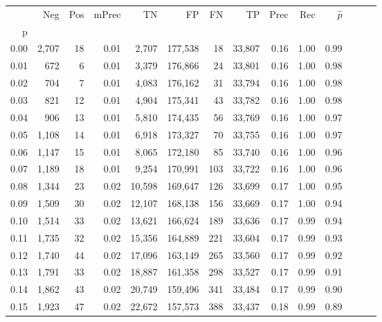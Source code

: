 \begin{tabular}{rrrrrrrrrrrrrr}
\toprule
{} &    Neg &  Pos & mPrec &       TN &       FP &      FN &      TP &  Prec &   Rec & $\hat{p}$ \\
p    &        &      &       &          &          &         &         &       &       &           \\
\midrule
0.00 &  2,707 &   18 &  0.01 &    2,707 &  177,538 &      18 &  33,807 &  0.16 &  1.00 &      0.99 \\
0.01 &    672 &    6 &  0.01 &    3,379 &  176,866 &      24 &  33,801 &  0.16 &  1.00 &      0.98 \\
0.02 &    704 &    7 &  0.01 &    4,083 &  176,162 &      31 &  33,794 &  0.16 &  1.00 &      0.98 \\
0.03 &    821 &   12 &  0.01 &    4,904 &  175,341 &      43 &  33,782 &  0.16 &  1.00 &      0.98 \\
0.04 &    906 &   13 &  0.01 &    5,810 &  174,435 &      56 &  33,769 &  0.16 &  1.00 &      0.97 \\
0.05 &  1,108 &   14 &  0.01 &    6,918 &  173,327 &      70 &  33,755 &  0.16 &  1.00 &      0.97 \\
0.06 &  1,147 &   15 &  0.01 &    8,065 &  172,180 &      85 &  33,740 &  0.16 &  1.00 &      0.96 \\
0.07 &  1,189 &   18 &  0.01 &    9,254 &  170,991 &     103 &  33,722 &  0.16 &  1.00 &      0.96 \\
0.08 &  1,344 &   23 &  0.02 &   10,598 &  169,647 &     126 &  33,699 &  0.17 &  1.00 &      0.95 \\
0.09 &  1,509 &   30 &  0.02 &   12,107 &  168,138 &     156 &  33,669 &  0.17 &  1.00 &      0.94 \\
0.10 &  1,514 &   33 &  0.02 &   13,621 &  166,624 &     189 &  33,636 &  0.17 &  0.99 &      0.94 \\
0.11 &  1,735 &   32 &  0.02 &   15,356 &  164,889 &     221 &  33,604 &  0.17 &  0.99 &      0.93 \\
0.12 &  1,740 &   44 &  0.02 &   17,096 &  163,149 &     265 &  33,560 &  0.17 &  0.99 &      0.92 \\
0.13 &  1,791 &   33 &  0.02 &   18,887 &  161,358 &     298 &  33,527 &  0.17 &  0.99 &      0.91 \\
0.14 &  1,862 &   43 &  0.02 &   20,749 &  159,496 &     341 &  33,484 &  0.17 &  0.99 &      0.90 \\
0.15 &  1,923 &   47 &  0.02 &   22,672 &  157,573 &     388 &  33,437 &  0.18 &  0.99 &      0.89 \\

\end{tabular}
